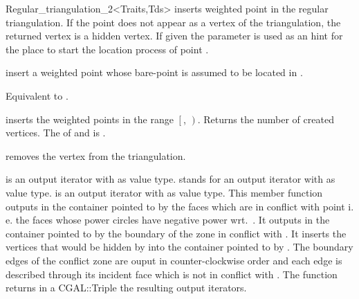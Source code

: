 \begin{ccRefClass}{Regular_triangulation_2<Traits,Tds>}
{inserts  weighted point  in the regular triangulation.
If the point   does not appear as a vertex of the triangulation,
the returned vertex is  a hidden vertex.
If given the parameter  is used as an hint
for the place to start the location process of point .}


{insert a weighted point  whose bare-point is assumed to be
located in  .}

{Equivalent to .}

{inserts the weighted points in the range
 $\left[\right.$, $\left.\right)$.
 Returns the number of created vertices.
 \ccPrecond The  of  and 
 is .}

{removes the vertex from the triangulation.}


 {
   is an output iterator with  as
  value type.   stands for an output
  iterator with  as value type.
   is an output iterator with
   as value type.  This member function outputs in
  the container pointed to by  the faces which are in
  conflict with point  i. e. the faces whose power circles
  have negative power wrt.\ .  It outputs in the container
  pointed to by  the boundary of the zone in conflict
  with .  It inserts the vertices that would be hidden by  
  into the container pointed to by .  The boundary edges of
  the conflict zone are ouput in counter-clockwise order and each edge
  is described through its incident face which is not in conflict with
  .  The function returns in a CGAL::Triple the resulting output
  iterators.}


\end{ccRefClass}
